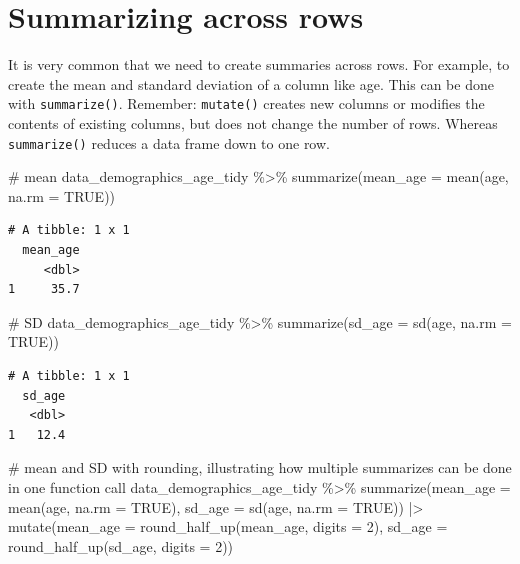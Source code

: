 \documentclass[
  letterpaper,
  DIV=11,
  numbers=noendperiod]{scrreprt}
\newenvironment{Shaded}{\begin{snugshade}}{\end{snugshade}}
\newcommand{\AttributeTok}[1]{\textcolor[rgb]{0.40,0.45,0.13}{#1}}
\newcommand{\CommentTok}[1]{\textcolor[rgb]{0.37,0.37,0.37}{#1}}
\newcommand{\ConstantTok}[1]{\textcolor[rgb]{0.56,0.35,0.01}{#1}}
\newcommand{\DecValTok}[1]{\textcolor[rgb]{0.68,0.00,0.00}{#1}}
\newcommand{\FunctionTok}[1]{\textcolor[rgb]{0.28,0.35,0.67}{#1}}
\newcommand{\NormalTok}[1]{\textcolor[rgb]{0.00,0.23,0.31}{#1}}
\newcommand{\SpecialCharTok}[1]{\textcolor[rgb]{0.37,0.37,0.37}{#1}}
\begin{document}
\section{Summarizing across rows}\label{summarizing-across-rows}

It is very common that we need to create summaries across rows. For
example, to create the mean and standard deviation of a column like age.
This can be done with \texttt{summarize()}. Remember: \texttt{mutate()}
creates new columns or modifies the contents of existing columns, but
does not change the number of rows. Whereas \texttt{summarize()} reduces
a data frame down to one row.

\begin{Shaded}
\begin{Highlighting}[]
\CommentTok{\# mean}
\NormalTok{data\_demographics\_age\_tidy }\SpecialCharTok{\%\textgreater{}\%}
  \FunctionTok{summarize}\NormalTok{(}\AttributeTok{mean\_age =} \FunctionTok{mean}\NormalTok{(age, }\AttributeTok{na.rm =} \ConstantTok{TRUE}\NormalTok{))}
\end{Highlighting}
\end{Shaded}

\begin{verbatim}
# A tibble: 1 x 1
  mean_age
     <dbl>
1     35.7
\end{verbatim}

\begin{Shaded}
\begin{Highlighting}[]
\CommentTok{\# SD}
\NormalTok{data\_demographics\_age\_tidy }\SpecialCharTok{\%\textgreater{}\%}
  \FunctionTok{summarize}\NormalTok{(}\AttributeTok{sd\_age =} \FunctionTok{sd}\NormalTok{(age, }\AttributeTok{na.rm =} \ConstantTok{TRUE}\NormalTok{))}
\end{Highlighting}
\end{Shaded}

\begin{verbatim}
# A tibble: 1 x 1
  sd_age
   <dbl>
1   12.4
\end{verbatim}

\begin{Shaded}
\begin{Highlighting}[]
\CommentTok{\# mean and SD with rounding, illustrating how multiple summarizes can be done in one function call}
\NormalTok{data\_demographics\_age\_tidy }\SpecialCharTok{\%\textgreater{}\%}
  \FunctionTok{summarize}\NormalTok{(}\AttributeTok{mean\_age =} \FunctionTok{mean}\NormalTok{(age, }\AttributeTok{na.rm =} \ConstantTok{TRUE}\NormalTok{),}
            \AttributeTok{sd\_age =} \FunctionTok{sd}\NormalTok{(age, }\AttributeTok{na.rm =} \ConstantTok{TRUE}\NormalTok{)) }\SpecialCharTok{|\textgreater{}}
  \FunctionTok{mutate}\NormalTok{(}\AttributeTok{mean\_age =} \FunctionTok{round\_half\_up}\NormalTok{(mean\_age, }\AttributeTok{digits =} \DecValTok{2}\NormalTok{),}
         \AttributeTok{sd\_age =} \FunctionTok{round\_half\_up}\NormalTok{(sd\_age, }\AttributeTok{digits =} \DecValTok{2}\NormalTok{))}
\end{Highlighting}
\end{Shaded}
\end{document}
